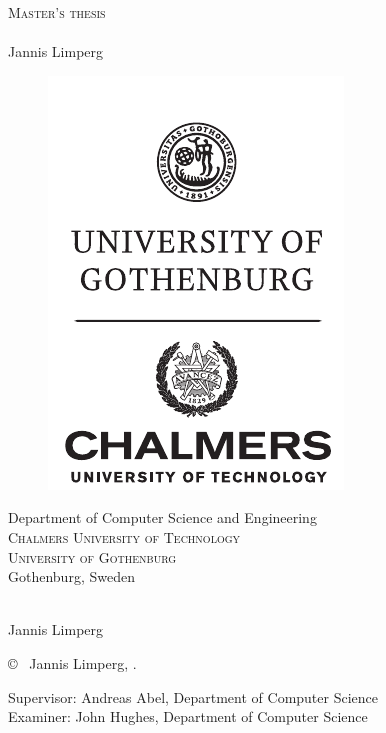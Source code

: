 \newpage
\thispagestyle{empty}
\begin{center}
	\textsc{\large Master's thesis \the\year}\\[4cm]		%
	\textbf{\Large \multiLineTitle{0.2cm}} \\[1cm]
	{\large Jannis Limperg}
	
	\vfill	
	\begin{figure}[H]
	\centering
	\includegraphics[width=0.25\pdfpagewidth]{figure/auxiliary/ChGULogoHog.pdf}
	\end{figure}	\vspace{5mm}	
	
	Department of Computer Science and Engineering\\
	\textsc{Chalmers University of Technology} \\
	\textsc{University of Gothenburg} \\
	Gothenburg, Sweden \the\year \\
\end{center}


\newpage
\thispagestyle{plain}
\vspace*{4.5cm}
\oneLineTitle\\
Jannis Limperg \setlength{\parskip}{1cm}

\copyright ~ Jannis Limperg, \the\year. \setlength{\parskip}{1cm}

Supervisor: Andreas Abel, Department of Computer Science\\
Examiner: John Hughes, Department of Computer Science \setlength{\parskip}{1cm}

